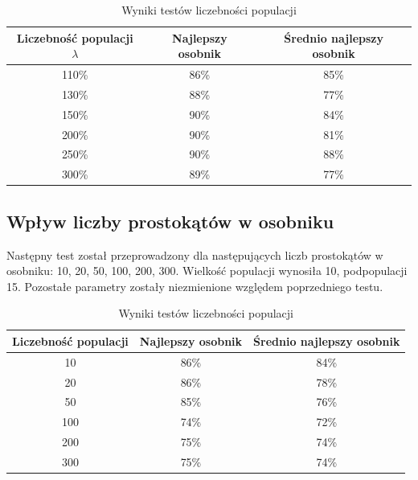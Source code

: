 \begin{table}[H]
    \centering
    \begin{tabular}{|c|c|c|}
    \hline
    Liczebność populacji $\lambda$  & Najlepszy osobnik & Średnio najlepszy osobnik \\ \hline
    110\%                           & 86\%              & 85\%                      \\ \hline
    130\%                           & 88\%              & 77\%                      \\ \hline
    150\%                           & 90\%              & 84\%                      \\ \hline
    200\%                           & 90\%              & 81\%                      \\ \hline
    250\%                           & 90\%              & 88\%                      \\ \hline
    300\%                           & 89\%              & 77\%                      \\ \hline
    \end{tabular}
    \caption{Wyniki testów liczebności populacji}
    \label{tab:crossing}
\end{table}

\subsection*{Wpływ liczby prostokątów w osobniku}
Następny test został przeprowadzony dla następujących liczb prostokątów w osobniku: 10, 20, 50, 100, 200, 300. Wielkość populacji wynosiła 10, podpopulacji 15. Pozostałe parametry zostały niezmienione względem poprzedniego testu. 

\begin{table}[H]
    \centering
    \begin{tabular}{|c|c|c|}
    \hline
    Liczebność populacji    & Najlepszy osobnik & Średnio najlepszy osobnik \\ \hline
    10                      & 86\%              & 84\%                      \\ \hline
    20                      & 86\%              & 78\%                      \\ \hline
    50                      & 85\%              & 76\%                      \\ \hline
    100                     & 74\%              & 72\%                      \\ \hline
    200                     & 75\%              & 74\%                      \\ \hline
    300                     & 75\%              & 74\%                      \\ \hline
    \end{tabular}
    \caption{Wyniki testów liczebności populacji}
    \label{tab:crossing}
\end{table}


